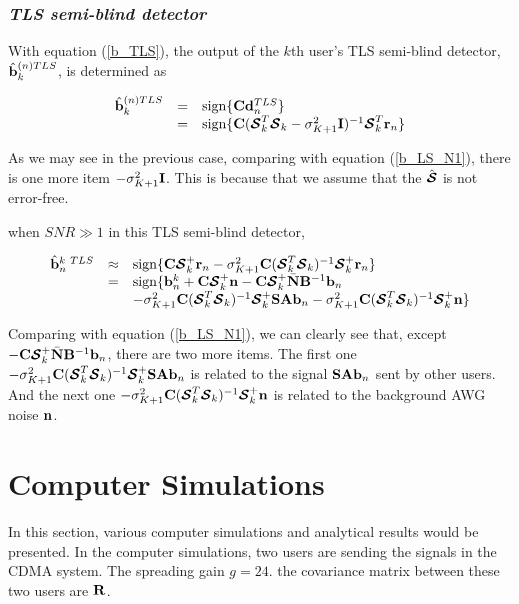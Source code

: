 \documentclass[a4paper,11pt,fleqn]{article}
\newcommand{\br}{{\mathbf r}}
\newcommand{\bA}{{\mathbf A}}
\newcommand{\bb}{{\bf b}}
\newcommand{\bC}{{\bf C}}
\newcommand{\bd}{{\bf d}}
\newcommand{\bn}{{\bf n}}
\newcommand{\bN}{{\bf N}}
\newcommand{\bS}{{\bf S}}
\newcommand{\bI}{{\bf I}}
\newcommand{\bR}{{\bf R}}
\newcommand{\bB}{{\bf B}}
\newcommand{\bcS}{{\mbox {\boldmath ${\cal S}$}}}
\begin{document}
\subsubsection*{\em TLS semi-blind detector\em }


With equation (\ref{b_TLS}), the output of the $k$th user's TLS
semi-blind detector, $\hat{\bb}_k^{(n) TLS}$, is determined as

\begin{equation}
\begin{array}{rcl}
\hat{\bb}_k^{(n)TLS }&=&\mbox{sign}\{\bC\bd_n^{TLS}\}\\
 &=&\mbox{sign}\{\bC(\bcS_k^T\bcS_k-\sigma_{K+1}^2\bI)^{-1}\bcS_k^T\br_n\}
\end{array}
\end{equation}

As we may see in the previous case, comparing with equation
(\ref{b_LS_N1}), there is one more item $-\sigma_{K+1}^2\bI$. This
is because that we assume that the $\hat{\bcS}$ is not error-free.

when $SNR\gg 1$ in this TLS semi-blind detector,

\begin{equation}
\begin{array}{rcl}
\hat{\bb}_n^{k\ TLS
}&\approx&\mbox{sign}\{\bC\bcS_k^{+}\br_n-\sigma_{K+1}^2\bC(\bcS_k^T\bcS_k)^{-1}\bcS_k^+\br_n\}\\
&=&\mbox{sign}\{\bb_n^{k}+\bC\bcS_k^+\bn-\bC\bcS_k^+\bar{\bN}\bB^{-1}\bb_n\\
&&-\sigma_{K+1}^2\bC(\bcS_k^T\bcS_k)^{-1}\bcS_k^{+}\bS\bA\bb_n-\sigma_{K+1}^2\bC(\bcS_k^T\bcS_k)^{-1}\bcS_k^+\bn\}
\end{array}
\end{equation}

Comparing with equation (\ref{b_LS_N1}), we can clearly see that,
except $-\bC\bcS_k^+\bar{\bN}\bB^{-1}\bb_n$, there are two more
items. The first one
$-\sigma_{K+1}^2\bC(\bcS_k^T\bcS_k)^{-1}\bcS_k^{+}\bS\bA\bb_n$ is
related to the signal $\bS\bA\bb_n$ sent by other users. And the
next one $-\sigma_{K+1}^2\bC(\bcS_k^T\bcS_k)^{-1}\bcS_k^+\bn$ is
related to the background AWG noise $\bn$.

\section{Computer Simulations}

In this section,  various computer simulations and analytical
results would be presented. In the computer simulations, two users
are sending the signals in the CDMA system. The spreading gain
$g=24$. the covariance matrix between these two users are $\bR$.
\end{document}

